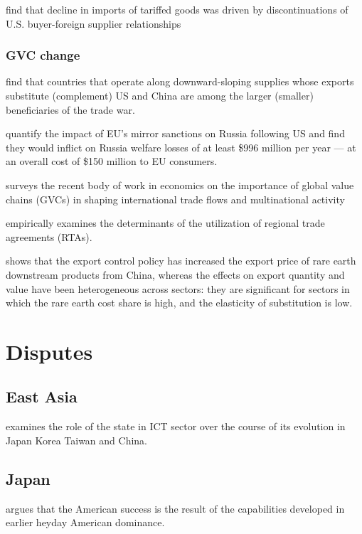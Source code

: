 \documentclass[10pt]{article} %
\begin{document}
        \cite{HandleyKamalMonarch2023} find that decline in imports of tariffed goods was driven by discontinuations of U.S. buyer-foreign supplier relationships

        \subsubsection{GVC change}
        \cite{FajgelbaumGoldbergKennedyKhandelwalTaglioni2021} find that countries that operate along downward-sloping supplies whose exports substitute (complement) US and China are among the larger (smaller) beneficiaries of the trade war.

        \cite{Latipovetal2022} quantify the impact of EU's mirror sanctions on Russia following US and find they would inflict on Russia welfare losses of at least \$996 million per year — at an overall cost of \$150 million to EU consumers.

        \cite{AntrasChor2022} surveys the recent body of work in economics on the importance of global value chains (GVCs) in shaping international trade flows and multinational activity

        \cite{Changetal2022} empirically examines the determinants of the utilization of regional trade agreements (RTAs).

        \cite{ChenHuLi2021} shows that the export control policy has increased the export price of rare earth downstream products from China, whereas the effects on export quantity and value have been heterogeneous across sectors: they are significant for sectors in which the rare earth cost share is high, and the elasticity of substitution is low.



    

\section{Disputes}
    \subsection{East Asia}
    \cite{Ning2008} examines the role of the state in ICT sector over the course of its evolution in Japan Korea Taiwan and China. 
    \subsection{Japan}
    \cite{LangloisSteinmueller2000} argues that the American success is the result of the capabilities developed in earlier heyday American dominance.
\end{document}
